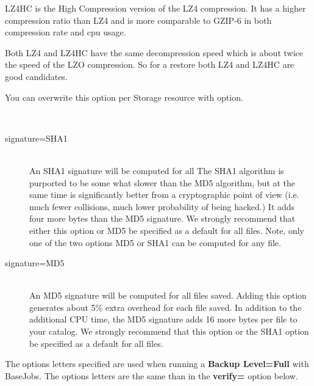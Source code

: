 \begin{description}
\begin{description}
    LZ4HC is the High Compression version of the LZ4 compression. It has
    a higher compression ratio than LZ4 and is more comparable to GZIP-6
    in both compression rate and cpu usage.

    Both LZ4 and LZ4HC have the same decompression speed which is about twice
    the speed of the LZO compression. So for a restore both LZ4 and LZ4HC are
    good candidates.

    You can overwrite this option per Storage resource with
     option.

    \end{description}

 \item [signature={\textless}SHA1{\textbar}MD5{\textgreater}] \hfill \\
\begin{description}

\item [signature=SHA1] \hfill \\
   An SHA1 signature will be computed for all The SHA1 algorithm is
   purported to be some what slower than the MD5 algorithm, but at the same
   time is significantly better from a cryptographic point of view (i.e.
   much fewer collisions, much lower probability of being hacked.) It adds
   four more bytes than the MD5 signature.  We strongly recommend that
   either this option or MD5 be specified as a default for all files.
   Note, only one of the two options MD5 or SHA1 can be computed for any
   file.

\item [signature=MD5] \hfill \\
   An MD5 signature will be computed for all files saved.  Adding this
   option generates about 5\% extra overhead for each file saved.  In
   addition to the additional CPU time, the MD5 signature adds 16 more
   bytes per file to your catalog.  We strongly recommend that this option
   or the SHA1 option be specified as a default for all files.
\end{description}


\item[basejob={\textless}options{\textgreater}]

The options letters specified are used when running a {\bf Backup Level=Full}
with BaseJobs. The options letters are the same than in the \textbf{verify=}
option below.


\end{description}
